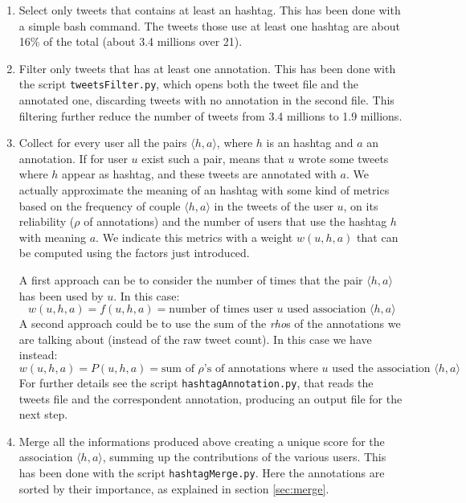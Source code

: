 \documentclass[a4paper,11pt,oneside]{article}
\newcommand{\ha}{$\langle h,a \rangle$\xspace}
\begin{document}
\begin{enumerate}
\item Select only tweets that contains at least an hashtag. This has been done with a simple bash command. The tweets those use at least one hashtag are about 16\% of the total (about 3.4 millions over 21).
\item Filter only tweets that has at least one annotation. This has been done with the script \texttt{tweetsFilter.py}, which opens both the tweet file and the annotated one, discarding tweets with no annotation in the second file. This filtering further reduce the number of tweets from 3.4 millions to 1.9 millions.
\item Collect for every user all the pairs \ha, where $h$ is an hashtag and $a$ an annotation. If for user $u$ exist such a pair, means that $u$ wrote some tweets where $h$ appear as hashtag, and these tweets are annotated with $a$. 
We actually approximate the meaning of an hashtag with some kind of metrics based on the frequency of couple \ha in the tweets of the user $u$, on its reliability ($\rho$ of annotations) and the number of users that use the hashtag $h$ with meaning $a$. We indicate this metrics with a weight $w(u,h,a)$ that can be computed using the factors just introduced.

A first approach can be to consider the number of times that the pair \ha has been used by $u$. In this case:
\begin{equation}
w(u,h,a) = f(u,h,a) = \text{number of times user $u$ used association \ha}
\end{equation} 
A second approach could be to use the sum of the \textit{rho}s of the annotations we are talking about (instead of the raw tweet count). In this case we have instead:
\begin{equation}
w(u,h,a) = P(u,h,a) = \text{sum of $\rho$'s of annotations where $u$ used the association \ha}
\end{equation} 
For further details see the script \texttt{hashtagAnnotation.py}, that reads the tweets file and the correspondent annotation, producing an output file for the next step.
\item Merge all the informations produced above creating a unique score for the association \ha, summing up the contributions of the various users. This has been done with the script \texttt{hashtagMerge.py}. Here the annotations are sorted by their importance, as explained in section \ref{sec:merge}.
\end{enumerate}
\end{document}

